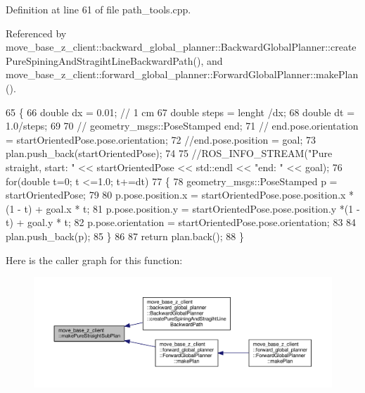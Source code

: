 Definition at line 61 of file path\+\_\+tools.\+cpp.



Referenced by move\+\_\+base\+\_\+z\+\_\+client\+::backward\+\_\+global\+\_\+planner\+::\+Backward\+Global\+Planner\+::create\+Pure\+Spining\+And\+Stragiht\+Line\+Backward\+Path(), and move\+\_\+base\+\_\+z\+\_\+client\+::forward\+\_\+global\+\_\+planner\+::\+Forward\+Global\+Planner\+::make\+Plan().


\begin{DoxyCode}
65     \{
66         \textcolor{keywordtype}{double} dx = 0.01; \textcolor{comment}{// 1 cm}
67         \textcolor{keywordtype}{double} steps = lenght /dx;
68         \textcolor{keywordtype}{double} dt = 1.0/steps;
69 
70         \textcolor{comment}{// geometry\_msgs::PoseStamped end;}
71         \textcolor{comment}{// end.pose.orientation = startOrientedPose.pose.orientation;}
72         \textcolor{comment}{//end.pose.position = goal;}
73         plan.push\_back(startOrientedPose);
74 
75         \textcolor{comment}{//ROS\_INFO\_STREAM("Pure straight, start: " << startOrientedPose << std::endl << "end: " << goal);}
76         \textcolor{keywordflow}{for}(\textcolor{keywordtype}{double} t=0; t <=1.0; t+=dt)
77         \{
78             geometry\_msgs::PoseStamped p = startOrientedPose;
79             
80             p.pose.position.x =  startOrientedPose.pose.position.x *(1 - t) + goal.x * t;
81             p.pose.position.y =  startOrientedPose.pose.position.y *(1 - t) + goal.y * t;
82             p.pose.orientation = startOrientedPose.pose.orientation;
83             
84             plan.push\_back(p);
85         \}
86     
87         \textcolor{keywordflow}{return} plan.back();
88     \}
\end{DoxyCode}


Here is the caller graph for this function\+:\nopagebreak
\begin{figure}[H]
\begin{center}
\leavevmode
\includegraphics[width=350pt]{namespacemove__base__z__client_aeda8dd87896b3e31221df66d02313358_icgraph}
\end{center}
\end{figure}


